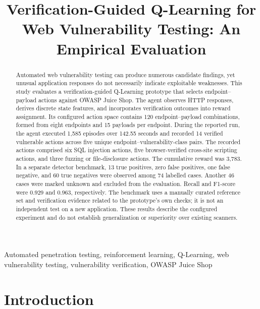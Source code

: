 \documentclass[conference]{IEEEtran}
\title{
Verification-Guided Q-Learning for Web Vulnerability Testing:
An Empirical Evaluation
}
\author{
\IEEEauthorblockN{Kevin Imanuel Setiawan}
\IEEEauthorblockA{
Program Studi Teknologi Informasi\\
Fakultas Informatika, Telkom University Surabaya\\
Surabaya, Indonesia\\
Email: your.email@example.com
}
}
\begin{document}
\maketitle

\begin{abstract}
Automated web vulnerability testing can produce numerous
candidate findings, yet unusual application responses do not
necessarily indicate exploitable weaknesses. This study
evaluates a verification-guided Q-Learning prototype that
selects endpoint--payload actions against OWASP Juice Shop.
The agent observes HTTP responses, derives discrete state
features, and incorporates verification outcomes into reward
assignment. Its configured action space contains 120
endpoint--payload combinations, formed from eight endpoints
and 15 payloads per endpoint. During the reported run, the
agent executed 1,585 episodes over 142.55 seconds and recorded
14 verified vulnerable actions across five unique
endpoint--vulnerability-class pairs.
The recorded actions comprised six SQL injection actions,
five browser-verified cross-site scripting actions, and three
fuzzing or file-disclosure actions. The cumulative reward
was 3,783. In a separate detector benchmark, 13 true positives,
zero false positives, one false negative, and 60 true negatives
were observed among 74 labelled cases. Another 46 cases were
marked unknown and excluded from the evaluation. Recall and
F1-score were 0.929 and 0.963, respectively. The benchmark uses
a manually curated reference set and verification evidence
related to the prototype's own checks; it is not an independent
test on a new application. These results describe the configured
experiment and do not establish generalization or superiority
over existing scanners.
\end{abstract}

\begin{IEEEkeywords}
Automated penetration testing, reinforcement learning,
Q-Learning, web vulnerability testing, vulnerability
verification, OWASP Juice Shop
\end{IEEEkeywords}

\section{Introduction}
\end{document}
